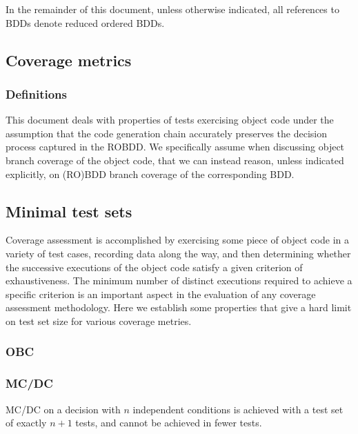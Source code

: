 \documentclass[a4paper,12pt,twoside]{article}
\begin{document}
In the remainder of this document, unless otherwise indicated, all
references to BDDs denote reduced ordered BDDs.

\subsection{Coverage metrics}

\subsubsection{Definitions}


This document deals with properties of tests exercising object code under
the assumption that the code generation chain accurately preserves the
decision process captured in the ROBDD. We specifically assume when
discussing object branch coverage of the object code, that we can instead
reason, unless indicated explicitly, on (RO)BDD branch coverage
of the corresponding BDD.

\subsection{Minimal test sets}

Coverage assessment is accomplished by exercising some piece of object
code in a variety of test cases, recording data along the way, and
then determining whether the successive executions of the object code
satisfy a given criterion of exhaustiveness. The minimum number of distinct
executions required to achieve a specific criterion is an important
aspect in the evaluation of any coverage assessment methodology. Here
we establish some properties that give a hard limit on test set size
for various coverage metries.

\subsubsection{OBC}

\subsubsection{MC/DC}

\begin{theorem}
MC/DC on a decision with $n$ independent conditions is achieved with
a test set of exactly $n+1$ tests, and cannot be achieved in fewer tests.
\end{theorem}
\end{document}
